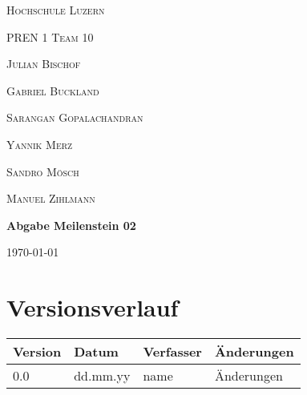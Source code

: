 \documentclass{scrarticle}                %
\newcommand{\Abgabenummer}{02}
\begin{document}

\begin{titlepage}
    \centering
    {\scshape\LARGE Hochschule Luzern \par}
    \vspace{1cm}
    {\scshape\Large PREN 1 Team 10\par}
    \vspace{1cm}

    {\scshape\large Julian Bischof\par}
    {\scshape\large Gabriel Buckland\par}
    {\scshape\large Sarangan Gopalachandran \par}
    {\scshape\large Yannik Merz\par}
    {\scshape\large Sandro Mösch\par}
    {\scshape\large Manuel Zihlmann\par}

    \vspace{1.5cm}
    {\huge\bfseries Abgabe Meilenstein \Abgabenummer \par}

    \vfill
    {\large \today\par}
\end{titlepage}

\newpage


\section*{Versionsverlauf}

\thispagestyle{nofooter}

\begin{longtable}{|p{2cm}|p{3cm}|p{3cm}|p{5cm}|}
    \hline
    \textbf{Version} & \textbf{Datum} & \textbf{Verfasser} & \textbf{Änderungen} \\
    \hline
    0.0              & dd.mm.yy     & name               & Änderungen                \\
    \hline
\end{longtable}
\end{document}
